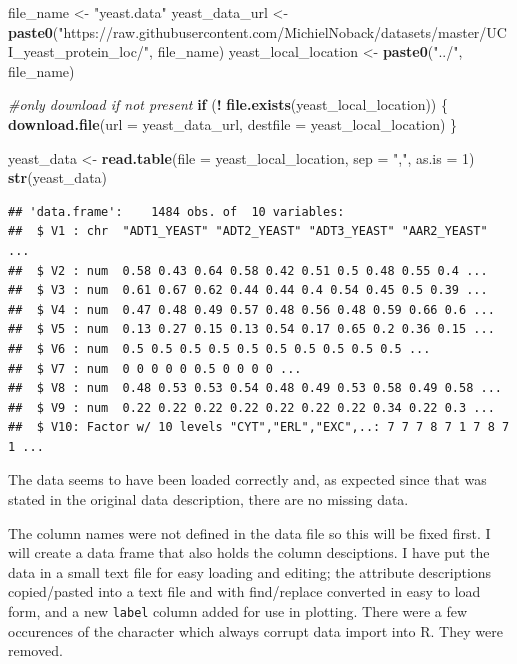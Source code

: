 \documentclass[]{book}
\newenvironment{Shaded}{\begin{snugshade}}{\end{snugshade}}
\newcommand{\CommentTok}[1]{\textcolor[rgb]{0.56,0.35,0.01}{\textit{#1}}}
\newcommand{\ControlFlowTok}[1]{\textcolor[rgb]{0.13,0.29,0.53}{\textbf{#1}}}
\newcommand{\DataTypeTok}[1]{\textcolor[rgb]{0.13,0.29,0.53}{#1}}
\newcommand{\DecValTok}[1]{\textcolor[rgb]{0.00,0.00,0.81}{#1}}
\newcommand{\KeywordTok}[1]{\textcolor[rgb]{0.13,0.29,0.53}{\textbf{#1}}}
\newcommand{\NormalTok}[1]{#1}
\newcommand{\OperatorTok}[1]{\textcolor[rgb]{0.81,0.36,0.00}{\textbf{#1}}}
\newcommand{\StringTok}[1]{\textcolor[rgb]{0.31,0.60,0.02}{#1}}
\begin{document}
\begin{Shaded}
\begin{Highlighting}[]
\NormalTok{file_name <-}\StringTok{ "yeast.data"}
\NormalTok{yeast_data_url <-}\StringTok{ }\KeywordTok{paste0}\NormalTok{(}\StringTok{"https://raw.githubusercontent.com/MichielNoback/datasets/master/UCI_yeast_protein_loc/"}\NormalTok{, file_name)}
\NormalTok{yeast_local_location <-}\StringTok{ }\KeywordTok{paste0}\NormalTok{(}\StringTok{"../"}\NormalTok{, file_name)}

\CommentTok{#only download if not present}
\ControlFlowTok{if}\NormalTok{ (}\OperatorTok{!}\StringTok{ }\KeywordTok{file.exists}\NormalTok{(yeast_local_location)) \{}
    \KeywordTok{download.file}\NormalTok{(}\DataTypeTok{url =}\NormalTok{ yeast_data_url, }
                  \DataTypeTok{destfile =}\NormalTok{ yeast_local_location)}
\NormalTok{\}}

\NormalTok{yeast_data <-}\StringTok{ }\KeywordTok{read.table}\NormalTok{(}\DataTypeTok{file =}\NormalTok{ yeast_local_location,}
                         \DataTypeTok{sep =} \StringTok{","}\NormalTok{,}
                         \DataTypeTok{as.is =} \DecValTok{1}\NormalTok{)}
\KeywordTok{str}\NormalTok{(yeast_data)}
\end{Highlighting}
\end{Shaded}

\begin{verbatim}
## 'data.frame':    1484 obs. of  10 variables:
##  $ V1 : chr  "ADT1_YEAST" "ADT2_YEAST" "ADT3_YEAST" "AAR2_YEAST" ...
##  $ V2 : num  0.58 0.43 0.64 0.58 0.42 0.51 0.5 0.48 0.55 0.4 ...
##  $ V3 : num  0.61 0.67 0.62 0.44 0.44 0.4 0.54 0.45 0.5 0.39 ...
##  $ V4 : num  0.47 0.48 0.49 0.57 0.48 0.56 0.48 0.59 0.66 0.6 ...
##  $ V5 : num  0.13 0.27 0.15 0.13 0.54 0.17 0.65 0.2 0.36 0.15 ...
##  $ V6 : num  0.5 0.5 0.5 0.5 0.5 0.5 0.5 0.5 0.5 0.5 ...
##  $ V7 : num  0 0 0 0 0 0.5 0 0 0 0 ...
##  $ V8 : num  0.48 0.53 0.53 0.54 0.48 0.49 0.53 0.58 0.49 0.58 ...
##  $ V9 : num  0.22 0.22 0.22 0.22 0.22 0.22 0.22 0.34 0.22 0.3 ...
##  $ V10: Factor w/ 10 levels "CYT","ERL","EXC",..: 7 7 7 8 7 1 7 8 7 1 ...
\end{verbatim}

The data seems to have been loaded correctly and, as expected since that was stated in the original data description, there are no missing data.

The column names were not defined in the data file so this will be fixed first. I will create a data frame that also holds the column desciptions. I have put the data in a small text file for easy loading and editing; the attribute descriptions copied/pasted into a text file and with find/replace converted in easy to load form, and a new \texttt{label} column added for use in plotting. There were a few occurences of the \texttt{\textquotesingle{}} character which always corrupt data import into R. They were removed.
\end{document}
